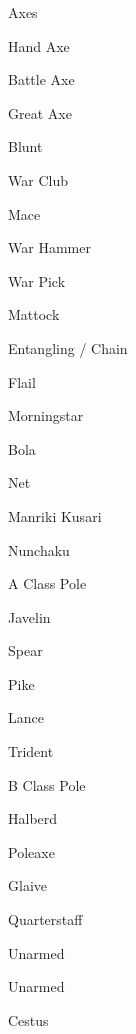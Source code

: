 \begin{table*}[h]
\begin{minipage}{\linewidth}
\begin{multicols}{4}
\begin{Enumerate}
\item Axes
\begin{Itemize}
\item Hand Axe
\item Battle  Axe
\item  Great  Axe
\end{Itemize}

\item Blunt
\begin{Itemize}
\item War Club
\item Mace
\item War Hammer
\item  War   Pick
\item Mattock
\end{Itemize}

\item Entangling / Chain
\begin{Itemize}
\item  Flail
\item Morningstar
\item Bola
\item Net
\item Manriki Kusari
\item Nunchaku
\end{Itemize}

\item A Class Pole
\begin{Itemize}
\item Javelin                              
\item Spear
\item Pike
\item Lance
\item Trident
\end{Itemize}

\item  B Class Pole
\begin{Itemize}
\item Halberd                   
\item Poleaxe
\item Glaive
\item Quarterstaff
\end{Itemize}

\item Unarmed
\begin{Itemize}
\item Unarmed
\item Cestus
\end{Itemize}


\end{Enumerate}
\end{multicols}
\end{minipage}
\end{table*}
